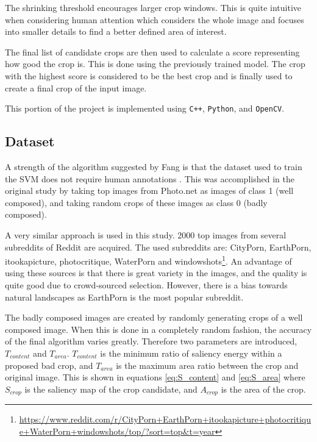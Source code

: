 The shrinking threshold encourages larger crop windows.
This is quite intuitive when considering human attention which considers the
whole image and focuses into smaller details to find a better defined area of
interest.

The final list of candidate crops are then used to calculate a score
representing how good the crop is.
This is done using the previously trained model.
The crop with the highest score is considered to be the best crop and is finally
used to create a final crop of the input image.

This portion of the project is implemented using \texttt{C++},
\texttt{Python}, and \texttt{OpenCV}.

\subsection{Dataset\label{sec:Cropping_Dataset}}

A strength of the algorithm suggested by Fang is that the dataset used to train
the SVM does not require human annotations \cite{fang2014automatic}.
This was accomplished in the original study by taking top images from Photo.net
as images of class 1 (well composed), and taking random crops of these images as
class 0 (badly composed).

A very similar approach is used in this study.
2000 top images from several subreddits of Reddit are acquired.
The used subreddits are: CityPorn, EarthPorn, itookapicture, photocritique,
WaterPorn and windowshots\footnote{\url{https://www.reddit.com/r/CityPorn+EarthPorn+itookapicture+photocritique+WaterPorn+windowshots/top/?sort=top&t=year}}.
An advantage of using these sources is that there is great variety in the
images, and the quality is quite good due to crowd-sourced selection.
However, there is a bias towards natural landscapes as EarthPorn is the most
popular subreddit.

The badly composed images are created by randomly generating crops of a well
composed image.
When this is done in a completely random fashion, the accuracy of the final
algorithm varies greatly.
Therefore two parameters are introduced, $T_{content}$ and $T_{area}$.
$T_{content}$ is the minimum ratio of saliency energy within a proposed bad
crop, and $T_{area}$ is the maximum area ratio between the crop and original
image.
This is shown in equations \ref{eq:S_content} and \ref{eq:S_area} where
$S_{crop}$ is the saliency map of the crop candidate, and $A_{crop}$ is the area
of the crop.


